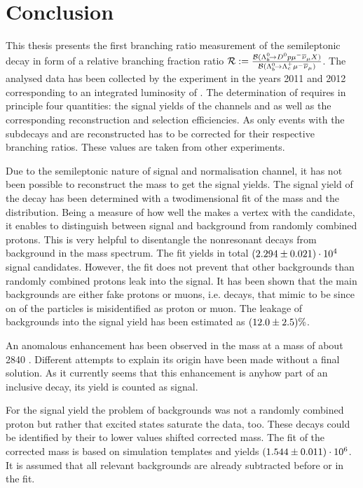 \chapter{Conclusion}
\label{sec:Conclusion}
This thesis presents the first branching ratio measurement of the semileptonic decay \LbToDpmunuX in form of a relative branching fraction ratio $\mathcal{R} := \frac{{\cal B}({{\Lambda}^0_{b}}\!\rightarrow {\ensuremath{{D}^0}}{\ensuremath{p}}{\ensuremath{\mu^-}}{\ensuremath{{\overline{\nu}}_\mu}} X)}{{\cal B}({{\Lambda}^0_{b}}\!\rightarrow {\ensuremath{{\Lambda}^+_{c}}}{\ensuremath{\mu^-}}{\ensuremath{{\overline{\nu}}_\mu}})}$.
The analysed data has been collected by the \lhcb experiment in the years 2011 and 2012 corresponding to an integrated luminosity of \intlum{3\invfb}.
The determination of \R requires in principle four quantities: the signal yields of the channels \LbToDpmunuX and \LbToLcmunu as well as the corresponding reconstruction and selection efficiencies.
As only events with the subdecays \DToKpi and \LcTopKpi are reconstructed \R has to be corrected for their respective branching ratios.
These values are taken from other experiments.

Due to the semileptonic nature of signal and normalisation channel, it has not been possible to reconstruct the \Lb mass to get the signal yields.
The signal yield of the decay \LbToDpmunuX has been determined with a twodimensional fit of the \Dz\proton mass and the \logIP distribution.
Being a measure of how well the \proton makes a vertex with the \Dz\mun candidate, it enables to distinguish between signal and background from randomly combined protons.
This is very helpful to disentangle the nonresonant \LbToDpmunuX decays from background in the \Dz\proton mass spectrum.
The fit yields in total $(2.294 \pm 0.021)\cdot 10^{4}$ signal candidates.
However, the fit does not prevent that other backgrounds than randomly combined protons leak into the signal.
It has been shown that the main backgrounds are either fake protons or muons, i.e. decays, that mimic to be \LbToDpmunuX since on of the particles is misidentified as proton or muon.
The leakage of backgrounds into the signal yield has been estimated as $(12.0 \pm 2.5)\%$.

An anomalous enhancement has been observed in the \Dz\proton mass at a mass of about 2840 \mev.
Different attempts to explain its origin have been made without a final solution.
As it currently seems that this enhancement is anyhow part of an inclusive \LbToDpmunuX decay, its yield is counted as signal.

For the \LbToLcmunu signal yield the problem of backgrounds was not a randomly combined proton but rather that excited \Lcstar states saturate the data, too.
These decays could be identified by their to lower values shifted corrected \Lb mass.
The fit of the corrected mass is based on simulation templates and yields $(1.544 \pm 0.011)\cdot 10^{6}$.
It is assumed that all relevant backgrounds are already subtracted before or in the fit.

